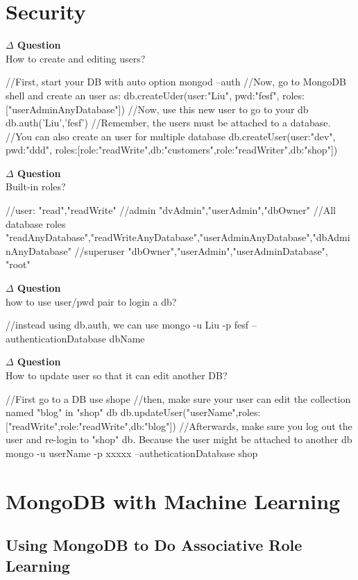 \documentclass[12pt]{article}
\newenvironment{que}
    { \begin{mdframed}[backgroundcolor=green!20] \textbf{$\Delta$ Question} \\}
    {  \end{mdframed}}
\begin{document}
\begin{code}
\section{Security}
\begin{que}
How to create and editing users?
\end{que}
\begin{code}
//First, start your DB with auto option
mongod --auth
//Now, go to MongoDB shell and create an user as:
db.createUder({user:"Liu", pwd:"fesf", roles:["userAdminAnyDatabase"]})
//Now, use this new user to go to your db
db.auth('Liu','fesf')
//Remember, the users must be attached to a database.
//You can also create an user for multiple database
db.createUser({user:"dev", pwd:"ddd", roles:[{role:"readWrite",db:"customers"},{role:"readWriter",db:"shop"}]})
\end{code}
\begin{que}
Built-in roles?
\end{que}
\begin{code}
//user:
"read","readWrite"
//admin
"dvAdmin","userAdmin","dbOwner"
//All database roles
"readAnyDatabase","readWriteAnyDatabase","userAdminAnyDatabase","dbAdminAnyDatabase"
//superuser
"dbOwner","userAdmin","userAdminDatabase", "root"
\end{code}
\begin{que}
how to use user/pwd pair to login a db?
\end{que}
\begin{code}
//instead using db.auth, we can use
mongo -u Liu -p fesf --authenticationDatabase dbName
\end{code}
\begin{que}
How to update user so that it can edit another DB?
\end{que}
\begin{code}
//First go to a DB
use shope
//then, make sure your user can edit the collection named "blog" in "shop" db
db.updateUser("userName",{roles:["readWrite",{role:"readWrite",db:"blog"}]})
//Afterwards, make sure you log out the user and re-login to "shop" db. Because the user might be attached to another db
mongo -u userName -p xxxxx --autheticationDatabase shop
\end{code}
\section{MongoDB with Machine Learning}
\subsection{Using MongoDB to Do Associative Role Learning}

\end{code}
\end{document}
